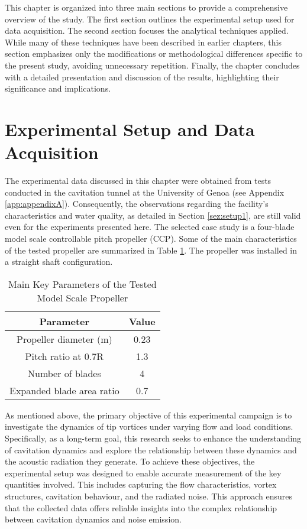 This chapter is organized into three main sections to provide a comprehensive overview of the study. The first section outlines the experimental setup used for data acquisition. The second section focuses the analytical techniques applied. While many of these techniques have been described in earlier chapters, this section emphasizes only the modifications or methodological differences specific to the present study, avoiding unnecessary repetition. Finally, the chapter concludes with a detailed presentation and discussion of the results, highlighting their significance and implications.

\section{Experimental Setup and Data Acquisition}
\label{sez:setup2}

The experimental data discussed in this chapter were obtained from tests conducted in the cavitation tunnel at the University of Genoa (see Appendix \ref{app:appendixA}). Consequently, the observations regarding the facility's characteristics and water quality, as detailed in Section \ref{sez:setup1}, are still valid even for the experiments presented here.
The selected case study is a four-blade model scale controllable pitch propeller (CCP). Some of the main characteristics of the tested propeller are summarized in Table \ref{tab:caseStudyFeatures}.
The propeller was installed in a straight shaft configuration.

\begin{table}[h]
    \centering
    \begin{tabular}{cc} 
        \toprule
        \textbf{Parameter} & \textbf{Value} \\ \midrule
        Propeller diameter (m) & 0.23 \\
        Pitch ratio at 0.7R & 1.3 \\
        Number of blades & 4 \\
        Expanded blade area ratio & 0.7 \\ 
        \bottomrule
    \end{tabular}
    \caption{Main Key Parameters of the Tested Model Scale Propeller}
    \label{tab:caseStudyFeatures}
\end{table}

As mentioned above, the primary objective of this experimental campaign is to investigate the dynamics of tip vortices under varying flow and load conditions. 
Specifically, as a long-term goal, this research seeks to enhance the understanding of cavitation dynamics and explore the relationship between these dynamics and the acoustic radiation they generate.
To achieve these objectives, the experimental setup was designed to enable accurate measurement of the key quantities involved. This includes capturing the flow characteristics, vortex structures, cavitation behaviour, and the radiated noise. This approach ensures that the collected data offers reliable insights into the complex relationship between cavitation dynamics and noise emission.


